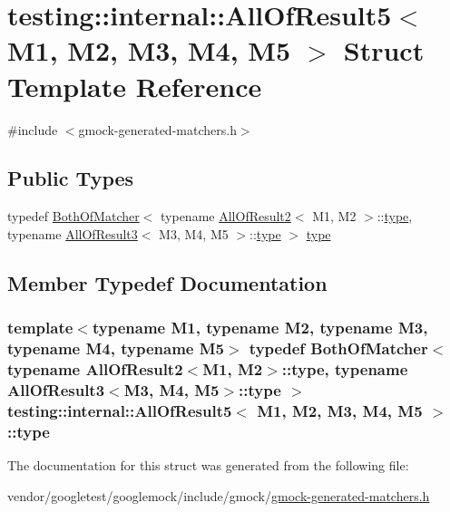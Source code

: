 \hypertarget{structtesting_1_1internal_1_1AllOfResult5}{}\section{testing\+:\+:internal\+:\+:All\+Of\+Result5$<$ M1, M2, M3, M4, M5 $>$ Struct Template Reference}
\label{structtesting_1_1internal_1_1AllOfResult5}


{\ttfamily \#include $<$gmock-\/generated-\/matchers.\+h$>$}

\subsection*{Public Types}
\begin{DoxyCompactItemize}
\item 
typedef \hyperlink{classtesting_1_1internal_1_1BothOfMatcher}{Both\+Of\+Matcher}$<$ typename \hyperlink{structtesting_1_1internal_1_1AllOfResult2}{All\+Of\+Result2}$<$ M1, M2 $>$\+::\hyperlink{structtesting_1_1internal_1_1AllOfResult5_aee2e1fb803f428741d147347b692d108}{type}, typename \hyperlink{structtesting_1_1internal_1_1AllOfResult3}{All\+Of\+Result3}$<$ M3, M4, M5 $>$\+::\hyperlink{structtesting_1_1internal_1_1AllOfResult5_aee2e1fb803f428741d147347b692d108}{type} $>$ \hyperlink{structtesting_1_1internal_1_1AllOfResult5_aee2e1fb803f428741d147347b692d108}{type}
\end{DoxyCompactItemize}


\subsection{Member Typedef Documentation}
\subsubsection[{\texorpdfstring{type}{type}}]{\setlength{\rightskip}{0pt plus 5cm}template$<$typename M1, typename M2, typename M3, typename M4, typename M5$>$ typedef {\bf Both\+Of\+Matcher}$<$ typename {\bf All\+Of\+Result2}$<$M1, M2$>$\+::{\bf type}, typename {\bf All\+Of\+Result3}$<$M3, M4, M5$>$\+::{\bf type} $>$ {\bf testing\+::internal\+::\+All\+Of\+Result5}$<$ M1, M2, M3, M4, M5 $>$\+::{\bf type}}\hypertarget{structtesting_1_1internal_1_1AllOfResult5_aee2e1fb803f428741d147347b692d108}{}\label{structtesting_1_1internal_1_1AllOfResult5_aee2e1fb803f428741d147347b692d108}


The documentation for this struct was generated from the following file\+:\begin{DoxyCompactItemize}
\item 
vendor/googletest/googlemock/include/gmock/\hyperlink{gmock-generated-matchers_8h}{gmock-\/generated-\/matchers.\+h}\end{DoxyCompactItemize}
